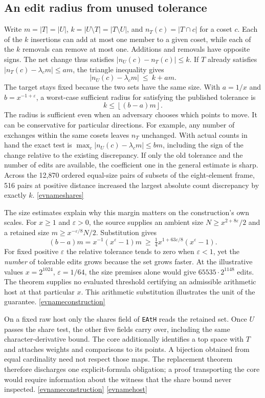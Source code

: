 \documentclass[11pt,letterpaper]{article}
\newcommand{\evref}[1]{\hyperlink{ev-#1}{\textsf{\small[\csname evname#1\endcsname]}}}
\begin{document}
\subsection{An edit radius from unused tolerance}
Write \(m=|T|=|U|\), \(k=|U\setminus T|=|T\setminus U|\), and \(n_T(c)=|T\cap c|\) for a coset \(c\). Each of the \(k\) insertions can add at most one member to a given coset, while each of the \(k\) removals can remove at most one. Additions and removals have opposite signs. The net change thus satisfies \(|n_U(c)-n_T(c)|\le k\). If \(T\) already satisfies \(|n_T(c)-\lambda_c m|\le a m\), the triangle inequality gives
\[
 |n_U(c)-\lambda_c m|\ \le\ k+a m .
\]
The target stays fixed because the two sets have the same size. With \(a=1/x\) and \(b=x^{-1+\varepsilon}\), a worst-case sufficient radius for satisfying the published tolerance is
\[
 k\le\left\lfloor (b-a)m\right\rfloor.
\]
The radius is sufficient even when an adversary chooses which points to move. It can be conservative for particular directions. For example, any number of exchanges within the same cosets leaves \(n_T\) unchanged. With actual counts in hand the exact test is \(\max_c|n_U(c)-\lambda_c m|\le b m\), including the sign of the change relative to the existing discrepancy. If only the old tolerance and the number of edits are available, the coefficient one in the general estimate is sharp. Across the 12,870 ordered equal-size pairs of subsets of the eight-element frame, 516 pairs at positive distance increased the largest absolute count discrepancy by exactly \(k\). \evref{shares}

The size estimates explain why this margin matters on the construction's own scales. For \(x\ge1\) and \(\varepsilon>0\), the source supplies an ambient size \(N\ge x^{2+8\varepsilon}/2\) and a retained size \(m\ge x^{-\varepsilon/8}N/2\). Substitution gives
\[
 (b-a)m=x^{-1}(x^\varepsilon-1)m
 \ \ge\ \tfrac14 x^{1+63\varepsilon/8}(x^\varepsilon-1).
\]
For fixed positive \(\varepsilon\) the relative tolerance tends to zero when \(\varepsilon<1\), yet the \emph{number} of tolerable edits grows because the set grows faster. At the illustrative values \(x=2^{1024}\), \(\varepsilon=1/64\), the size premises alone would give \(65535\cdot 2^{1148}\) edits. The theorem supplies no evaluated threshold certifying an admissible arithmetic host at that particular \(x\). This arithmetic substitution illustrates the unit of the guarantee. \evref{construction}

On a fixed raw host only the shares field of \texttt{EAtH} reads the retained set. Once \(U\) passes the share test, the other five fields carry over, including the same character-derivative bound. The core additionally identifies a top space with \(T\) and attaches weights and comparisons to its points. A bijection obtained from equal cardinality need not respect those maps. The replacement theorem therefore discharges one explicit-formula obligation; a proof transporting the core would require information about the witness that the share bound never inspected. \evref{construction} \evref{host}
\end{document}
